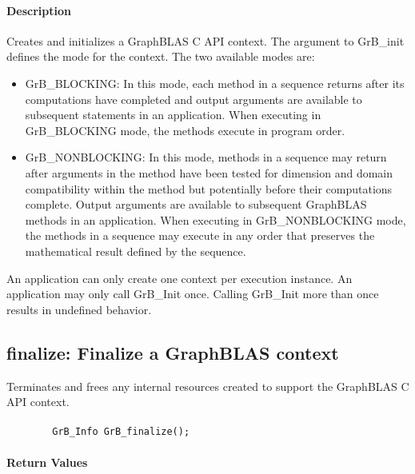 \paragraph{Description}

Creates and initializes a GraphBLAS C API context.  The argument
to {\sf GrB\_init} defines the mode for the context.  The two
available modes are:

\begin{itemize}
\item {\sf GrB\_BLOCKING}: In this mode, each method in a sequence returns after
its computations have completed and output arguments are available to
subsequent statements in an application.  When executing in {\sf
GrB\_BLOCKING} mode, the methods execute in program order.

\item {\sf GrB\_NONBLOCKING}: In this mode, methods in a sequence may return after arguments
in the method have been tested for dimension and domain compatibility
within the method but potentially before their computations complete.  Output
arguments are available to subsequent GraphBLAS methods in an application.
When executing in {\sf GrB\_NONBLOCKING} mode, the methods in a sequence
may execute in any order that preserves the mathematical result defined
by the sequence.
\end{itemize}

An application can only create one context per execution instance.  An application
may only call {\sf GrB\_Init} once.  Calling {\sf GrB\_Init} more
than once results in undefined behavior.

\subsection{{\sf finalize}: Finalize a GraphBLAS context}

Terminates and frees any internal resources created to support the
GraphBLAS C API context.

\paragraph{\syntax}

\begin{verbatim}
        GrB_Info GrB_finalize();
\end{verbatim}

\paragraph{Return Values}

